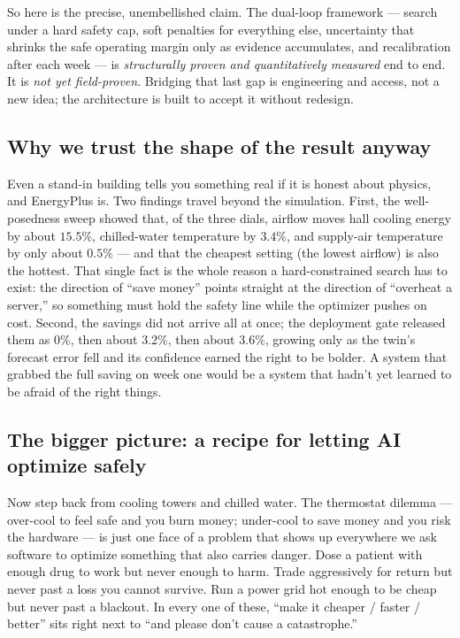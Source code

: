 \documentclass[11pt]{report}
\begin{document}
So here is the precise, unembellished claim. The dual-loop framework --- search under a hard safety cap, soft penalties for everything else, uncertainty that shrinks the safe operating margin only as evidence accumulates, and recalibration after each week --- is \emph{structurally proven and quantitatively measured} end to end. It is \emph{not yet field-proven}. Bridging that last gap is engineering and access, not a new idea; the architecture is built to accept it without redesign.

\subsection{Why we trust the shape of the result anyway}

Even a stand-in building tells you something real if it is honest about physics, and EnergyPlus is. Two findings travel beyond the simulation. First, the well-posedness sweep showed that, of the three dials, airflow moves hall cooling energy by about $15.5\%$, chilled-water temperature by $3.4\%$, and supply-air temperature by only about $0.5\%$ --- and that the cheapest setting (the lowest airflow) is also the hottest. That single fact is the whole reason a hard-constrained search has to exist: the direction of ``save money'' points straight at the direction of ``overheat a server,'' so something must hold the safety line while the optimizer pushes on cost. Second, the savings did not arrive all at once; the deployment gate released them as $0\%$, then about $3.2\%$, then about $3.6\%$, growing only as the twin's forecast error fell and its confidence earned the right to be bolder. A system that grabbed the full saving on week one would be a system that hadn't yet learned to be afraid of the right things.

\subsection{The bigger picture: a recipe for letting AI optimize safely}

Now step back from cooling towers and chilled water. The thermostat dilemma --- over-cool to feel safe and you burn money; under-cool to save money and you risk the hardware --- is just one face of a problem that shows up everywhere we ask software to optimize something that also carries danger. Dose a patient with enough drug to work but never enough to harm. Trade aggressively for return but never past a loss you cannot survive. Run a power grid hot enough to be cheap but never past a blackout. In every one of these, ``make it cheaper / faster / better'' sits right next to ``and please don't cause a catastrophe.''
\end{document}
